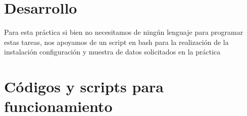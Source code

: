 \documentclass[10pt,executivepaper]{article}
\begin{document}
\begin{center}
	\par{}
\par{}
\par{}
\par\vspace{2cm}{
	Ultima fecha modificado: \today
}
\end{center}

\clearpage
\section{Desarrollo}
Para esta práctica si bien no necesitamos de ningún lenguaje para programar estas tareas, nos apoyamos de un script en bash para la realización de la instalación configuración y muestra de datos solicitados en la práctica
\section{Códigos y scripts para funcionamiento}
\end{document}
